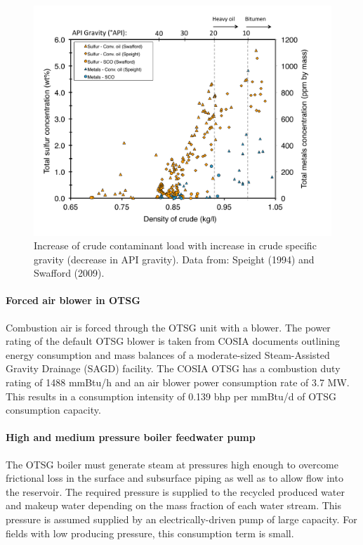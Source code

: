 \documentclass[11pt]{report}
\newcommand{\marg}[1]{{\footnotesize\textit{\textcolor{stanford}{'#1'}}}}
\newcommand{\marginnote}[1]{\marginpar{\marg{#1}}}
\begin{document}
\begin{figure}[t]
\includegraphics[width=0.8\columnwidth]{images/crude_contaminants.pdf}
\caption{Increase of crude contaminant load with increase in crude specific gravity (decrease in API gravity). Data from: Speight (1994) and Swafford (2009).}
\label{fig:crude_contaminants}
\end{figure}

\paragraph{Forced air blower in OTSG}

Combustion air is forced through the OTSG unit with a blower.\marginnote{Steam Generation 2.2.8.3} The power rating of the default OTSG blower is taken from COSIA documents outlining energy consumption and mass balances of a moderate-sized Steam-Assisted Gravity Drainage (SAGD) facility.  The COSIA OTSG has a combustion duty rating of 1488 mmBtu/h and an air blower power consumption rate of 3.7 MW.  This results in a consumption intensity of 0.139 bhp per mmBtu/d of OTSG consumption capacity.

\paragraph{High and medium pressure boiler feedwater pump}

The OTSG boiler must generate steam at pressures high enough to overcome frictional loss in the surface and subsurface piping as well as to allow flow into the reservoir.  The required pressure is supplied to the recycled produced water and makeup water depending on the mass fraction of each water stream.  This pressure is assumed supplied by an electrically-driven pump of large capacity.  For fields with low producing pressure, this consumption term is small.
\end{document}
